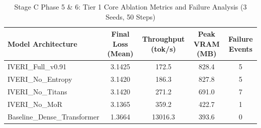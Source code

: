 \begin{table}[h]
\centering
\caption{Stage C Phase 5 \& 6: Tier 1 Core Ablation Metrics and Failure Analysis (3 Seeds, 50 Steps)}
\label{tab:stage_c_tier1}
\begin{tabular}{lcccc}
\hline
\textbf{Model Architecture} & \textbf{Final Loss (Mean)} & \textbf{Throughput (tok/s)} & \textbf{Peak VRAM (MB)} & \textbf{Failure Events} \\
\hline
IVERI\_Full\_v0.91             & 3.1425 &   172.5 &  828.4 & 5 \\
IVERI\_No\_Entropy             & 3.1420 &   186.3 &  827.8 & 5 \\
IVERI\_No\_Titans              & 3.1420 &   271.2 &  691.0 & 7 \\
IVERI\_No\_MoR                 & 3.1365 &   359.2 &  422.7 & 1 \\
Baseline\_Dense\_Transformer   & 1.3664 & 13016.3 &  393.6 & 0 \\
\hline
\end{tabular}
\end{table}
